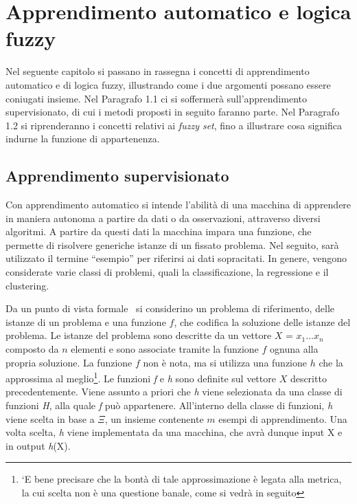 \documentclass[11pt,  oneside, openany]{book}
\begin{document}
	\chapter{Apprendimento automatico e logica fuzzy}
Nel seguente capitolo si passano in rassegna i concetti di apprendimento automatico e di logica fuzzy, illustrando come i due argomenti possano essere coniugati insieme. Nel Paragrafo 1.1 ci si soffermerà sull'apprendimento supervisionato, di cui i metodi proposti in seguito faranno parte. Nel Paragrafo 1.2 si riprenderanno i concetti relativi ai \textit {fuzzy set}, fino a illustrare cosa significa indurne la funzione di appartenenza. 

	\section{Apprendimento supervisionato}

Con apprendimento automatico si intende l'abilità di una macchina di apprendere in maniera autonoma a partire da dati o da osservazioni, attraverso diversi algoritmi. A partire da questi dati la macchina impara una funzione, che permette di risolvere generiche istanze di un fissato problema. Nel seguito, sarà utilizzato il termine ``esempio'' per riferirsi ai dati sopracitati. In genere, vengono considerate varie classi di problemi, quali la classificazione, la regressione e il clustering. 

Da un punto di vista formale~\cite {mlstanford} si considerino un problema di riferimento, delle istanze di un problema e una funzione  $f$, che codifica la soluzione delle istanze del problema. Le istanze del problema sono descritte da un vettore  $X$ = $x_1...x_n$ composto da $n$ elementi e sono associate tramite la funzione $f$ ognuna alla propria soluzione. La funzione $f$ non è nota, ma si utilizza una funzione $h$ che la approssima al meglio\footnote{`E bene precisare che la bontà di tale approssimazione è legata alla metrica, la cui scelta non è una questione banale, come si vedrà in seguito}.  Le funzioni \textit {f} e \textit {h} sono definite sul vettore $X$ descritto precedentemente. Viene assunto a priori che \textit {h} viene selezionata da una classe di funzioni \textit {H}, alla quale \textit {f} può appartenere.  All'interno della classe di funzioni, \textit {h} viene scelta in base a $\Xi$, un insieme contenente $m$ esempi di apprendimento. Una volta scelta, \textit {h} viene implementata da una macchina, che avrà dunque input X e in output \textit {h}(X). 
\end{document}
